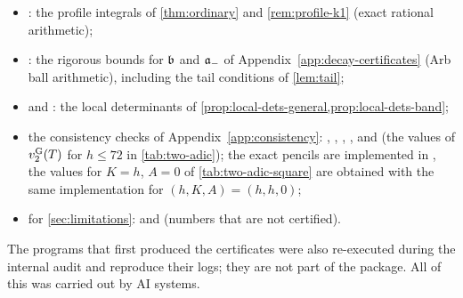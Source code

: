\begin{itemize}
\item {}: the profile integrals of \cref{thm:ordinary} and
\cref{rem:profile-k1} (exact rational arithmetic);
\item {}: the rigorous bounds for $\mathfrak{b}$ and $\mathfrak{a}_-$ of
Appendix~\ref{app:decay-certificates} (Arb ball arithmetic), including the tail conditions of
\cref{lem:tail};
\item {} and : the local
determinants of \cref{prop:local-dets-general,prop:local-dets-band};
\item the consistency checks of Appendix~\ref{app:consistency}: ,
, ,
, and  (the values of $v_{2}^{\mathrm{G}}(T)$
for $h\le72$ in \cref{tab:two-adic}); the exact pencils are implemented in
, the values for $K=h$, $A=0$ of
\cref{tab:two-adic-square} are obtained with the same implementation for $(h,K,A)=(h,h,0)$;
\item for \cref{sec:limitations}:  and
 (numbers that are not certified).
\end{itemize}
The programs that first produced the certificates were also re-executed during the internal audit
and reproduce their logs; they are not part of the package. All of this was carried out by AI
systems.

